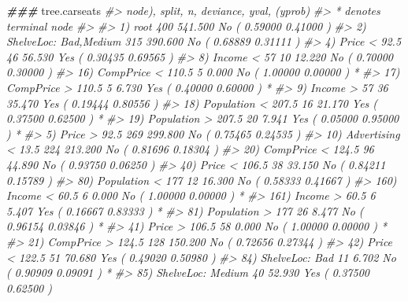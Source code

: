 \documentclass[
]{book}
\newenvironment{Shaded}{\begin{snugshade}}{\end{snugshade}}
\newcommand{\CommentTok}[1]{\textcolor[rgb]{0.56,0.35,0.01}{\textit{#1}}}
\newcommand{\DocumentationTok}[1]{\textcolor[rgb]{0.56,0.35,0.01}{\textbf{\textit{#1}}}}
\newcommand{\NormalTok}[1]{#1}
\begin{document}
\begin{Shaded}
\begin{Highlighting}[]
\DocumentationTok{\#\#\#}
\NormalTok{tree.carseats}
\CommentTok{\#\textgreater{} node), split, n, deviance, yval, (yprob)}
\CommentTok{\#\textgreater{}       * denotes terminal node}
\CommentTok{\#\textgreater{} }
\CommentTok{\#\textgreater{}   1) root 400 541.500 No ( 0.59000 0.41000 )  }
\CommentTok{\#\textgreater{}     2) ShelveLoc: Bad,Medium 315 390.600 No ( 0.68889 0.31111 )  }
\CommentTok{\#\textgreater{}       4) Price \textless{} 92.5 46  56.530 Yes ( 0.30435 0.69565 )  }
\CommentTok{\#\textgreater{}         8) Income \textless{} 57 10  12.220 No ( 0.70000 0.30000 )  }
\CommentTok{\#\textgreater{}          16) CompPrice \textless{} 110.5 5   0.000 No ( 1.00000 0.00000 ) *}
\CommentTok{\#\textgreater{}          17) CompPrice \textgreater{} 110.5 5   6.730 Yes ( 0.40000 0.60000 ) *}
\CommentTok{\#\textgreater{}         9) Income \textgreater{} 57 36  35.470 Yes ( 0.19444 0.80556 )  }
\CommentTok{\#\textgreater{}          18) Population \textless{} 207.5 16  21.170 Yes ( 0.37500 0.62500 ) *}
\CommentTok{\#\textgreater{}          19) Population \textgreater{} 207.5 20   7.941 Yes ( 0.05000 0.95000 ) *}
\CommentTok{\#\textgreater{}       5) Price \textgreater{} 92.5 269 299.800 No ( 0.75465 0.24535 )  }
\CommentTok{\#\textgreater{}        10) Advertising \textless{} 13.5 224 213.200 No ( 0.81696 0.18304 )  }
\CommentTok{\#\textgreater{}          20) CompPrice \textless{} 124.5 96  44.890 No ( 0.93750 0.06250 )  }
\CommentTok{\#\textgreater{}            40) Price \textless{} 106.5 38  33.150 No ( 0.84211 0.15789 )  }
\CommentTok{\#\textgreater{}              80) Population \textless{} 177 12  16.300 No ( 0.58333 0.41667 )  }
\CommentTok{\#\textgreater{}               160) Income \textless{} 60.5 6   0.000 No ( 1.00000 0.00000 ) *}
\CommentTok{\#\textgreater{}               161) Income \textgreater{} 60.5 6   5.407 Yes ( 0.16667 0.83333 ) *}
\CommentTok{\#\textgreater{}              81) Population \textgreater{} 177 26   8.477 No ( 0.96154 0.03846 ) *}
\CommentTok{\#\textgreater{}            41) Price \textgreater{} 106.5 58   0.000 No ( 1.00000 0.00000 ) *}
\CommentTok{\#\textgreater{}          21) CompPrice \textgreater{} 124.5 128 150.200 No ( 0.72656 0.27344 )  }
\CommentTok{\#\textgreater{}            42) Price \textless{} 122.5 51  70.680 Yes ( 0.49020 0.50980 )  }
\CommentTok{\#\textgreater{}              84) ShelveLoc: Bad 11   6.702 No ( 0.90909 0.09091 ) *}
\CommentTok{\#\textgreater{}              85) ShelveLoc: Medium 40  52.930 Yes ( 0.37500 0.62500 )  }

\end{Highlighting}
\end{Shaded}
\end{document}
